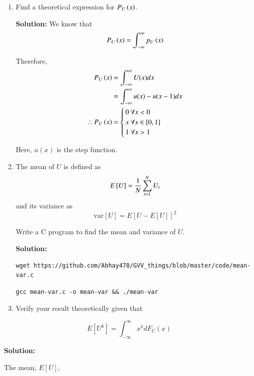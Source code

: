 \documentclass[journal,12pt,twocolumn]{IEEEtran}
\renewcommand\thesection{\arabic{section}}
\providecommand{\sbrak}[1]{\ensuremath{{}\left[#1\right]}}
\theoremstyle{remark}
\newcommand{\solution}{\noindent \textbf{Solution: }}
\numberwithin{equation}{section}
\numberwithin{equation}{section}
\begin{document}
\begin{enumerate}[label=\thesection.\arabic*,ref=\thesection.\theenumi]
%
\item
Find a  theoretical expression for $\cdf{x}{U}$.

\solution
We know that 
\begin{equation}
    \cdf{x}{U} = \int_{-\infty}^\infty \pdf{x}{U}
\end{equation}

Therefore,
		\begin{align}
			\cdf{x}{U} &= \int_{-\infty}^\infty U(x) dx \nonumber \\
			&= \int_{-\infty}^\infty u(x) - u(x - 1) dx \nonumber \\
			\therefore \cdf{x}{U} &= 
			\begin{cases}
				0\ \forall x < 0 \\
				x\ \forall x \in [0, 1] \\
				1\ \forall x > 1
			\end{cases}
                \label{uni-cdf}
		\end{align}

		Here, $u(x)$ is the step function.

\item
The mean of $U$ is defined as
%
\begin{equation}
E\sbrak{U} = \inv{N}\sum_{i=1}^{N}U_i
\end{equation}
%
and its variance as
%
\begin{equation}
\text{var}\sbrak{U} = E\sbrak{U- E\sbrak{U}}^2 
\end{equation}

Write a C program to  find the mean and variance of $U$.

\solution

\begin{lstlisting}
wget https://github.com/Abhay478/GVV_things/blob/master/code/mean-var.c
\end{lstlisting}

\begin{lstlisting}
gcc mean-var.c -o mean-var && ./mean-var
\end{lstlisting}


\item Verify your result theoretically given that
\end{enumerate}
%
\begin{equation}
E\sbrak{U^k} = \int_{-\infty}^{\infty}x^kdF_{U}(x)
\end{equation}

\solution

The mean, $E[U]$,
\end{document}
